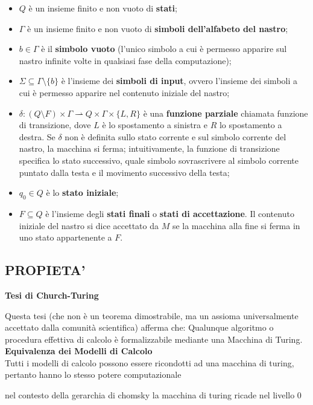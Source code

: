 \documentclass[12pt, a4paper, oneside]{article}
\begin{document}
\begin{itemize}
    \item $Q$ è un insieme finito e non vuoto di \textbf{stati};
    \item $\Gamma$ è un insieme finito e non vuoto di \textbf{simboli dell'alfabeto del nastro};
    \item $b \in \Gamma$ è il \textbf{simbolo vuoto} (l'unico simbolo a cui è permesso apparire sul nastro infinite volte in qualsiasi fase della computazione);
    \item $\Sigma \subseteq \Gamma \setminus \{b\}$ è l'insieme dei \textbf{simboli di input}, ovvero l'insieme dei simboli a cui è permesso apparire nel contenuto iniziale del nastro;
    \item $\delta: (Q \setminus F) \times \Gamma \rightharpoonup Q \times \Gamma \times \{L, R\}$ è una \textbf{funzione parziale} chiamata funzione di transizione, dove $L$ è lo spostamento a sinistra e $R$ lo spostamento a destra. Se $\delta$ non è definita sullo stato corrente e sul simbolo corrente del nastro, la macchina si ferma; intuitivamente, la funzione di transizione specifica lo stato successivo, quale simbolo sovrascrivere al simbolo corrente puntato dalla testa e il movimento successivo della testa;
    \item $q_0 \in Q$ è lo \textbf{stato iniziale};
    \item $F \subseteq Q$ è l'insieme degli \textbf{stati finali} o \textbf{stati di accettazione}. Il contenuto iniziale del nastro si dice accettato da $M$ se la macchina alla fine si ferma in uno stato appartenente a $F$.
\end{itemize}
\subsection*{PROPIETA’}
\textbf{Tesi di Church-Turing}

Questa tesi (che non è un teorema dimostrabile, ma un assioma universalmente accettato dalla comunità scientifica) afferma che: 
Qualunque algoritmo o procedura effettiva di calcolo è formalizzabile mediante una Macchina di Turing. 
\medskip
\newline
\textbf{Equivalenza dei Modelli di Calcolo}\\
Tutti i modelli di calcolo possono essere ricondotti ad una macchina di turing, pertanto hanno lo stesso potere computazionale

nel contesto della gerarchia di chomsky la macchina di turing ricade nel livello 0
\end{document}
